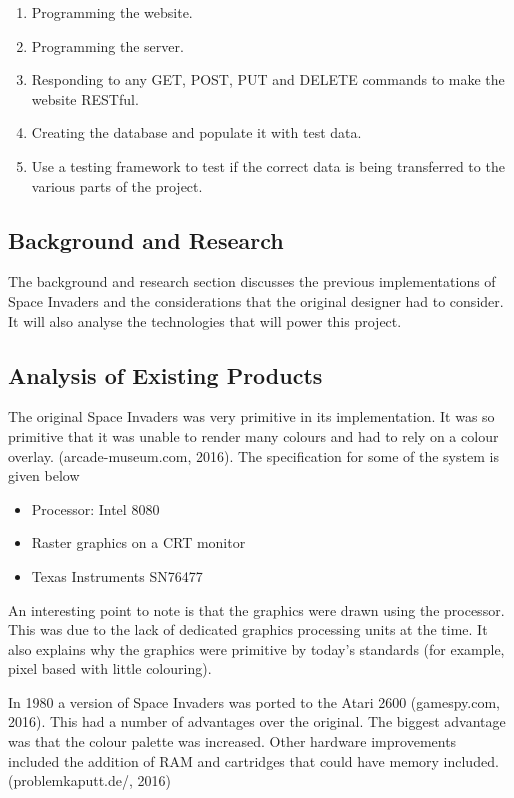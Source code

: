 \documentclass[12pt]{article}
\begin{document}
\begin{enumerate}
\item Programming the website.
\item Programming the server.
\item Responding to any GET, POST, PUT and DELETE commands to make the
website RESTful.
\item Creating the database and populate it with test data.
\item Use a testing framework to test if the correct data is being transferred to the
various parts of the project.
\end{enumerate}
\newpage

\begin{center}
\section{Background and Research}
\end{center}
The background and research section discusses the previous implementations of Space Invaders and the considerations that the original designer had to consider. It will also analyse the technologies that will power this project. 

{\centering \subsection{Analysis of Existing Products}}
The original Space Invaders was very primitive in its implementation. It was so primitive that it was unable to render many colours and had to rely on a colour overlay. (arcade-museum.com, 2016). The specification for some of the system is given below


\begin{itemize}
	\item Processor: Intel 8080
	\item Raster graphics on a CRT monitor
	\item Texas Instruments SN76477
\end{itemize}

An interesting point to note is that the graphics were drawn using the processor. This was due to the lack of dedicated graphics processing units at the time. It also explains why the graphics were primitive by today's standards (for example, pixel based with little colouring).

In 1980 a version of Space Invaders was ported to the Atari 2600 (gamespy.com, 2016). This had a number of advantages over the original. The biggest advantage was that the colour palette was increased. Other hardware improvements included the addition of RAM and cartridges that could have memory included. (problemkaputt.de/, 2016)
\end{document}
